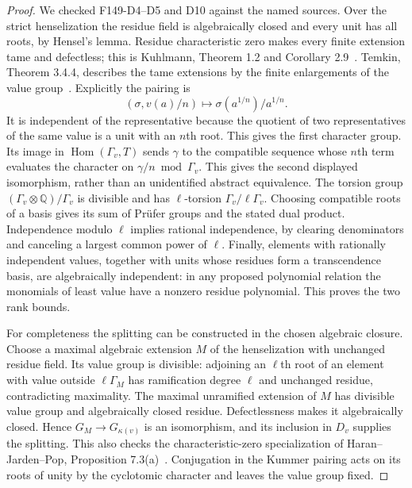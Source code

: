 \documentclass[11pt,oneside]{article}
\begin{document}
\begin{proof}
We checked F149-D4--D5 and D10 against the named sources.
Over the strict henselization the residue field is algebraically
closed and every unit has all roots, by Hensel's lemma. Residue
characteristic zero makes every finite extension tame and
defectless; this is Kuhlmann, Theorem 1.2 and Corollary
2.9~\cite{F-KuhlmannTame}. Temkin, Theorem 3.4.4, describes
the tame extensions by the finite enlargements of the value
group~\cite{F-Temkin}. Explicitly the pairing is
\[
 (\sigma,v(a)/n)\longmapsto \sigma(a^{1/n})/a^{1/n}.
\]
It is independent of the representative because the quotient
of two representatives of the same value is a unit with an
$n$th root. This gives the first character group. Its image in
$\operatorname{Hom}(\Gamma_v,T)$ sends $\gamma$ to the
compatible sequence whose $n$th term evaluates the character
on $\gamma/n\bmod\Gamma_v$. This gives the second displayed
isomorphism, rather than an unidentified abstract equivalence.
The torsion group $(\Gamma_v\otimes\mathbb Q)/\Gamma_v$ is
divisible and has $\ell$-torsion $\Gamma_v/\ell\Gamma_v$.
Choosing compatible roots of a basis gives its sum of Pr\"ufer
groups and the stated dual product. Independence modulo $\ell$
implies rational independence, by clearing denominators and
canceling a largest common power of $\ell$. Finally, elements
with rationally independent values, together with units whose
residues form a transcendence basis, are algebraically
independent: in any proposed polynomial relation the monomials
of least value have a nonzero residue polynomial. This proves
the two rank bounds.

For completeness the splitting can be constructed in the chosen
algebraic closure. Choose a maximal algebraic extension $M$ of
the henselization with unchanged residue field. Its value group
is divisible: adjoining an $\ell$th root of an element with value
outside $\ell\Gamma_M$ has ramification degree $\ell$ and
unchanged residue, contradicting maximality. The maximal
unramified extension of $M$ has divisible value group and
algebraically closed residue. Defectlessness makes it algebraically
closed. Hence $G_M\to G_{\kappa(v)}$ is an isomorphism, and
its inclusion in $D_v$ supplies the splitting. This also checks
the characteristic-zero specialization of Haran--Jarden--Pop,
Proposition 7.3(a)~\cite{F-HaranJardenPop}. Conjugation in the
Kummer pairing acts on its roots of unity by the cyclotomic
character and leaves the value group fixed.


\end{proof}
\end{document}
